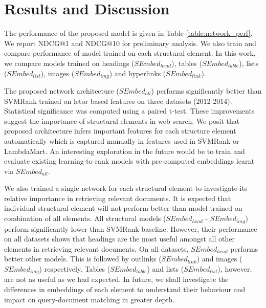 \section{Results and Discussion}
\label{sec:results_and_discussion}
The performance of the proposed model is given in Table \ref{table:network_perf}. 
We report NDCG$@$1 and NDCG$@$10 for preliminary analysis. We also train and compare 
performance of model trained on each structural element. In this work, we compare 
models trained on headings ($SEmbed_{head}$), tables ($SEmbed_{table}$), 
lists ($SEmbed_{list}$), images ($SEmbed_{img}$) and hyperlinks ($SEmbed_{link}$). 

The proposed network architecture ($SEmbed_{all}$) performs significantly better than 
SVMRank trained on letor based features 
on three datasets (2012-2014). Statistical significance was computed using a paired t-test. 
These improvements suggest the importance of structural elements in web search. 
We posit that proposed architecture infers important features for each structure element automatically 
which is captured manually in features used in SVMRank or LambdaMart. 
An interesting exploration in the future would be to train and evaluate existing 
learning-to-rank models with pre-computed embeddings learnt via $SEmbed_{all}$.

We also trained a single network for each structural element to investigate  
its relative importance in retrieving relevant documents. It is expected that 
individual structural element will not perform better than model trained on 
combination of all elements. All structural models ($SEmbed_{head}$ - $SEmbed_{img}$) 
perform significantly lower than SVMRank baseline. 
However, their performance on all datasets shows that headings are the most useful amongst 
all other elements in retrieving relevant documents. On all datasets, 
$SEmbed_{head}$ performs better other models. 
This is followed by outlinks ($SEmbed_{link}$) and images ($SEmbed_{img}$) respectively. 
Tables ($SEmbed_{table}$) and lists ($SEmbed_{list}$), however, are not as useful as we had expected.
In future, we shall investigate the differences in embeddings of each element 
to understand their behaviour and impact on query-document matching in greater depth. 



